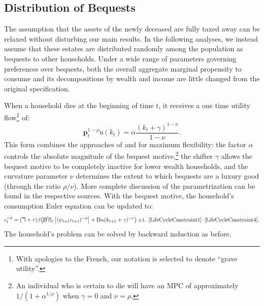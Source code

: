 \documentclass{econtex}\usepackage[pdftex]{graphicx}\usepackage{epstopdf} \usepackage[pdftex]{hyperref}
\newcommand{\cRat}{\ensuremath{c}}
\newcommand{\CRRA}{\ensuremath{\rho}}
\newcommand{\Discount}{\ensuremath{\beta}}
\newcommand{\kRat}{\ensuremath{k}}
\newcommand{\PDies}{\ensuremath{\mathsf{D}}}
\newcommand{\pLev}{\ensuremath{\pmb{p}}}
\newcommand{\PLives}{\ensuremath{\cancel{\PDies}}}
\newcommand{\pshk}{\psi} %
\newcommand{\rProd}{\ensuremath{\mathit{r}}}
\newcommand{\util}{{\ensuremath{\mathrm{u}}}}
\begin{document}
\subsection{Distribution of Bequests}

The assumption that the assets of the newly deceased are fully taxed away can be relaxed without disturbing our main results.  In the following analyses, we instead assume that these estates are distributed randomly among the population as bequests to other households.  Under a wide range of parameters governing preferences over bequests, both the overall aggregate marginal propensity to consume and its decompositions by wealth and income are little changed from the original specification.

When a household dies at the beginning of time $t$, it receives a one time utility flow\footnote{With apologies to the French, our notation is selected to denote ``grave utility''.} of:
\begin{equation*}
\pLev_t ^{1-\CRRA}\grave{\util}(\kRat_t) = \alpha \frac{(\kRat_t + \gamma)^{1-\nu}}{1 - \nu}.
\end{equation*}
This form combines the approaches of \cite{Cagetti} and \cite{WhyDoRichSave} for maximum flexibility: the factor $\alpha$ controls the absolute magnitude of the bequest motive,\footnote{An individual who is certain to die will have an MPC of approximately $1/(1 + \alpha^{1/\CRRA})$ when $\gamma = 0$ and $\nu = \CRRA$.} the shifter $\gamma$ allows the bequest motive to be completely inactive for lower wealth households, and the curvature parameter $\nu$ determines the extent to which bequests are a luxury good (through the ratio $\CRRA/\nu$).  More complete discussion of the parametrization can be found in the respective sources.  With the bequest motive, the household's consumption Euler equation can be updated to:
\begin{equation*}
\cRat_t^{-\CRRA} = (\daleth +\rProd) \Discount \big( \PLives \Ex_t \left[ (\pshk_{t+1} \cRat_{t+1})^{-\CRRA} \right] + \PDies \alpha(\kRat_{t+1} + \gamma)^{-\nu}\big) \text{ s.t. \eqref{LifeCycleConstraint1}--\eqref{LifeCycleConstraint4}}.
\end{equation*}
The household's problem can be solved by backward induction as before.
\end{document}

